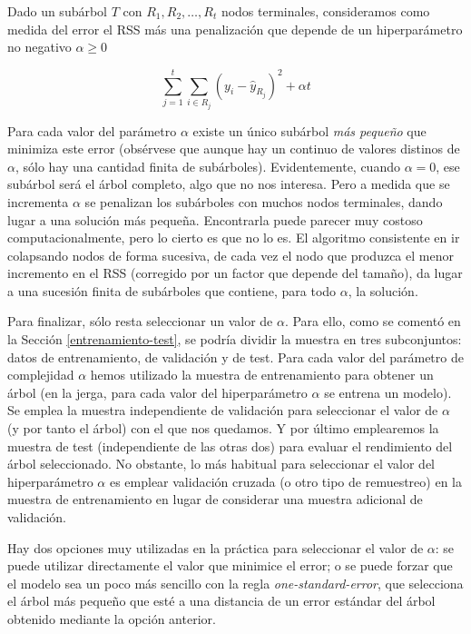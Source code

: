 \documentclass[]{book}
\theoremstyle{break}
\theoremstyle{definition}
\theoremstyle{definition}
\theoremstyle{definition}
\theoremstyle{remark}
\begin{document}
Dado un subárbol \(T\) con \(R_1, R_2, \ldots, R_t\) nodos terminales,
consideramos como medida del error el RSS más una penalización que
depende de un hiperparámetro no negativo \(\alpha \ge 0\)

\[\sum_{j=1}^t \sum_{i\in R_j} (y_i - \widehat y_{R_j})^2 + \alpha t\]

Para cada valor del parámetro \(\alpha\) existe un único subárbol
\emph{más pequeño} que minimiza este error (obsérvese que aunque hay un
continuo de valores distinos de \(\alpha\), sólo hay una cantidad finita
de subárboles). Evidentemente, cuando \(\alpha = 0\), ese subárbol será
el árbol completo, algo que no nos interesa. Pero a medida que se
incrementa \(\alpha\) se penalizan los subárboles con muchos nodos
terminales, dando lugar a una solución más pequeña. Encontrarla puede
parecer muy costoso computacionalmente, pero lo cierto es que no lo es.
El algoritmo consistente en ir colapsando nodos de forma sucesiva, de
cada vez el nodo que produzca el menor incremento en el RSS (corregido
por un factor que depende del tamaño), da lugar a una sucesión finita de
subárboles que contiene, para todo \(\alpha\), la solución.

Para finalizar, sólo resta seleccionar un valor de \(\alpha\). Para
ello, como se comentó en la Sección \ref{entrenamiento-test}, se podría
dividir la muestra en tres subconjuntos: datos de entrenamiento, de
validación y de test. Para cada valor del parámetro de complejidad
\(\alpha\) hemos utilizado la muestra de entrenamiento para obtener un
árbol (en la jerga, para cada valor del hiperparámetro \(\alpha\) se
entrena un modelo). Se emplea la muestra independiente de validación
para seleccionar el valor de \(\alpha\) (y por tanto el árbol) con el
que nos quedamos. Y por último emplearemos la muestra de test
(independiente de las otras dos) para evaluar el rendimiento del árbol
seleccionado. No obstante, lo más habitual para seleccionar el valor del
hiperparámetro \(\alpha\) es emplear validación cruzada (o otro tipo de
remuestreo) en la muestra de entrenamiento en lugar de considerar una
muestra adicional de validación.

Hay dos opciones muy utilizadas en la práctica para seleccionar el valor
de \(\alpha\): se puede utilizar directamente el valor que minimice el
error; o se puede forzar que el modelo sea un poco más sencillo con la
regla \emph{one-standard-error}, que selecciona el árbol más pequeño que
esté a una distancia de un error estándar del árbol obtenido mediante la
opción anterior.
\end{document}
